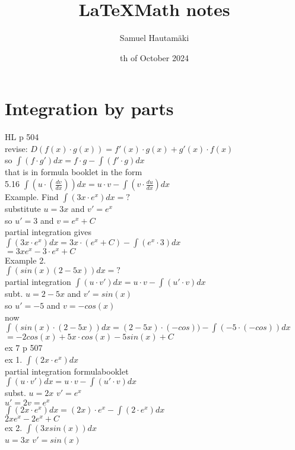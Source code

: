 \documentclass{article}
\title{\LaTeX Math notes}
\author{Samuel Hautamäki}
\date{th of October 2024}
\begin{document}
  \maketitle
   
  \section{Integration by parts}
  HL p 504\\
  revise: $D(f(x)\cdot g(x))=f'(x)\cdot g(x)+g'(x)\cdot f(x)$\\
  so $\int(f\cdot g')dx=f\cdot g-\int(f'\cdot g)dx$\\
  that is in formula booklet in the form\\
  5.16 $\int (u\cdot(\frac{dv}{dx}))dx=u\cdot v-\int(v\cdot\frac{du}{dx})dx$\\
  Example. Find $\int (3x\cdot e^x)dx=?$\\
  substitute $u=3x$ and $v'=e^x$\\
  so $u'=3$ and $v=e^x+C$\\
  partial integration gives\\
  $\int(3x\cdot e^x)dx=3x\cdot (e^x+C)-\int(e^x\cdot3)dx$\\
  $=3xe^x-3\cdot e^x+C$\\
  Example 2.\\
  $\int(sin(x)(2-5x))dx=?$\\
  partial integration $\int(u\cdot v')dx=u\cdot v-\int(u'\cdot v)dx$\\
  subt. $u=2-5x$ and $v'=sin(x)$\\
  so $u'=-5$ and $v=-cos(x)$\\
  now $\int(sin(x)\cdot(2-5x))dx=(2-5x)\cdot(-cos))-\int(-5\cdot(-cos)) dx$\\
  $=-2cos(x)+5x\cdot cos(x)-5 sin(x)+C$\\
  ex 7 p 507\\
  ex 1. $\int (2x\cdot e^x)dx$\\ 
  partial integration formulabooklet\\
  $\int(u\cdot v')dx=u\cdot v-\int(u'\cdot v)dx$\\
  subst. $u=2x$ $v'=e^x$\\
  $u'=2 v=e^x$\\
  $\int(2x\cdot e^x)dx=(2x)\cdot e^x-\int(2\cdot e^x)dx$\\
  $2xe^x-2e^x+C$\\
  ex 2. $\int (3x sin(x))dx$\\
  $u=3x$ $v'=sin(x)$\\
\end{document}
